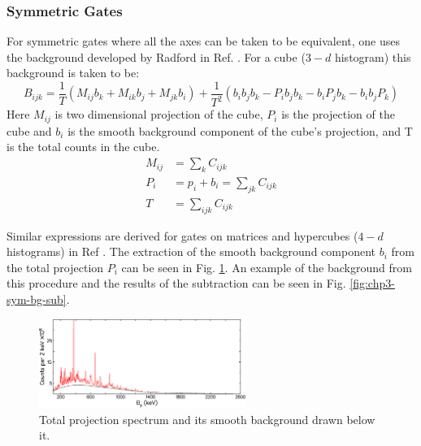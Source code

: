 \subsubsection{Symmetric Gates}
\label{sssec:exp-pr-data-proc-bg-sub-sym}
For symmetric gates where all the axes can be taken to be equivalent, one uses the background developed by Radford in Ref. \cite{symBGSub}. For a cube ($3-d$ histogram) this background is taken to be:
\begin{equation}
\label{eqn:chp3-cube-bg}
B_{ijk}=\frac{1}{T}\left(M_{ij}b_{k} + M_{ik}b_{j} + M_{jk}b_{i}\right) + \frac{1}{T^{2}}\left(b_{i}b_{j}b_{k} - P_{i}b_{j}b_{k} - b_{i}P_{j}b_{k} - b_{i}b_{j}P_{k}\right)
\end{equation} 
Here $M_{ij}$ is two dimensional projection of the cube, $P_{i}$ is the projection of the cube and $b_{i}$ is the smooth background component of the cube's projection, and T is the total counts in the cube.
\begin{align}
\label{eqn:chp3-cube-bg-defs}
M_{ij} &= \sum\limits_{k}^{}C_{ijk} \\
P_i &= p_i + b_i = \sum\limits_{jk}^{}C_{ijk}\\
T &= \sum\limits_{ijk}^{}C_{ijk}
\end{align}

Similar expressions are derived for gates on matrices and hypercubes ($4-d$ histograms) in Ref \cite{symBGSub}. The extraction of the smooth background component $b_{i}$ from the total projection $P_{i}$ can be seen in  Fig. \ref{fig:chp3-smooth-bg}. An example of the background from this procedure and the results of the subtraction can be seen in Fig. \ref{fig:chp3-sym-bg-sub}. 
\begin{figure}[h!]
	\centerline{\includegraphics[width=0.6\textwidth]{./img/c3/smth_bg.eps}}
	\caption{Total projection spectrum and its smooth background drawn below it.}
	\label{fig:chp3-smooth-bg}
\end{figure}

